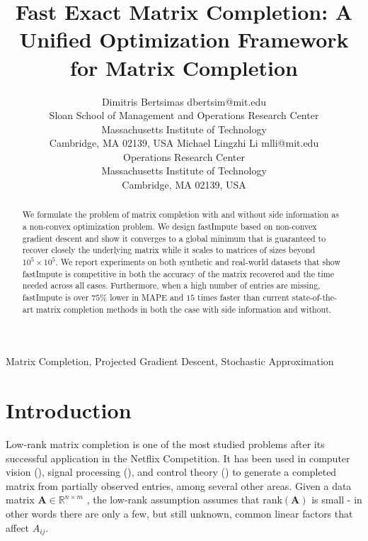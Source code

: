 \documentclass[twoside,11pt]{article}
\newcommand{\md}[1]{\mathbb{#1}}
\begin{document}
\title{Fast Exact Matrix Completion: A Unified Optimization Framework for Matrix Completion}

\author{\name Dimitris Bertsimas \email dbertsim@mit.edu \\
       \addr Sloan School of Management and Operations Research Center\\
       Massachusetts Institute of Technology\\
       Cambridge, MA 02139, USA
       \AND
       \name Michael Lingzhi Li \email mlli@mit.edu \\
       \addr Operations Research Center\\
       Massachusetts Institute of Technology\\
       Cambridge, MA 02139, USA}



\maketitle

\begin{abstract}%
We formulate   the problem of matrix completion  with and without side information as a non-convex optimization problem. 
We design fastImpute based on non-convex gradient descent and   show it converges to a global minimum that is guaranteed to 
recover  closely the underlying matrix while it scales to matrices of sizes beyond $10^5 \times 10^5$. We report experiments on both synthetic and real-world datasets that show fastImpute is competitive in both the accuracy of the matrix recovered and the time needed across all cases. Furthermore, when a high number of entries are missing, fastImpute is over $75\%$ lower in MAPE and $15$ times  faster than current state-of-the-art matrix completion methods in both the case with side information and without.
\end{abstract}

\begin{keywords}
  Matrix Completion, Projected Gradient Descent,  Stochastic Approximation
\end{keywords}

\section{Introduction\label{sec:Introduction}}
Low-rank matrix completion is one of the most studied problems after its successful application in the Netflix Competition. It  has been used in 
 computer vision (\cite{candes2010matrix}), signal processing (\cite{ji2010robust}), and control theory (\cite{boyd1994linear}) to generate a completed matrix from partially observed entries,
 among several other areas. Given a data matrix $\bm{A} \in \md{R}^{n\times m}$ , the low-rank assumption assumes that rank$({\bm A})$ is small - in other words 
there are only a few, but still  unknown, common linear factors that  affect  $A_{ij}$. 
\end{document}
